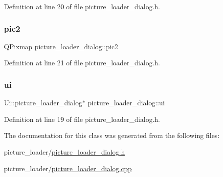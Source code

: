 Definition at line 20 of file picture\+\_\+loader\+\_\+dialog.\+h.

\mbox{\label{classpicture__loader__dialog_a2e44ce23637092664a86ad018094c4f3}} 
\subsubsection{\texorpdfstring{pic2}{pic2}}
{\footnotesize\ttfamily Q\+Pixmap picture\+\_\+loader\+\_\+dialog\+::pic2\hspace{0.3cm}{\ttfamily [private]}}



Definition at line 21 of file picture\+\_\+loader\+\_\+dialog.\+h.

\mbox{\label{classpicture__loader__dialog_ae91f4f9f193071a755fe6cf6ba5caa23}} 
\subsubsection{\texorpdfstring{ui}{ui}}
{\footnotesize\ttfamily Ui\+::picture\+\_\+loader\+\_\+dialog$\ast$ picture\+\_\+loader\+\_\+dialog\+::ui\hspace{0.3cm}{\ttfamily [private]}}



Definition at line 19 of file picture\+\_\+loader\+\_\+dialog.\+h.



The documentation for this class was generated from the following files\+:\begin{DoxyCompactItemize}
\item 
picture\+\_\+loader/\hyperlink{picture__loader__dialog_8h}{picture\+\_\+loader\+\_\+dialog.\+h}\item 
picture\+\_\+loader/\hyperlink{picture__loader__dialog_8cpp}{picture\+\_\+loader\+\_\+dialog.\+cpp}\end{DoxyCompactItemize}
